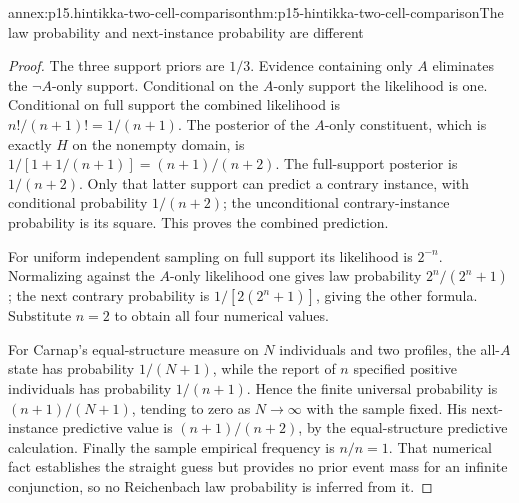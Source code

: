 \begin{annexitem}{annex:p15.hintikka-two-cell-comparison}{thm:p15-hintikka-two-cell-comparison}{The law probability and next-instance probability are different}
\begin{proof}
The three support priors are \(1/3\). Evidence containing only
\(A\) eliminates the \(\neg A\)-only support. Conditional on
the \(A\)-only support the likelihood is one. Conditional on full
support the combined likelihood is \(n!/(n+1)!=1/(n+1)\).
The posterior of the \(A\)-only constituent, which is exactly
\(H\) on the nonempty domain, is
\(1/[1+1/(n+1)]=(n+1)/(n+2)\). The full-support posterior is
\(1/(n+2)\). Only that latter support can predict a contrary
instance, with conditional probability \(1/(n+2)\); the unconditional
contrary-instance probability is its square. This proves the combined
prediction.

For uniform independent sampling on full support its likelihood is
\(2^{-n}\). Normalizing against the \(A\)-only likelihood one
gives law probability \(2^n/(2^n+1)\); the next contrary probability
is \(1/[2(2^n+1)]\), giving the other formula. Substitute \(n=2\)
to obtain all four numerical values.

For Carnap's equal-structure measure on \(N\) individuals and two
profiles, the all-\(A\) state has probability \(1/(N+1)\),
while the report of \(n\) specified positive individuals has
probability \(1/(n+1)\). Hence the finite universal probability is
\((n+1)/(N+1)\), tending to zero as \(N\to\infty\) with the
sample fixed. His next-instance predictive value is
\((n+1)/(n+2)\), by the equal-structure predictive calculation.
Finally the sample empirical frequency is \(n/n=1\). That numerical
fact establishes the straight guess but provides no prior event mass
for an infinite conjunction, so no Reichenbach law probability is
inferred from it.
\end{proof}
\end{annexitem}

